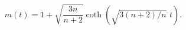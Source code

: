 \begin{equation} m(t) = 1+
	    \sqrt{\frac{3n}{n+2}} \coth \left(\sqrt{3(n+2)/n}\,\,
	    t\right) .  \end{equation} 
